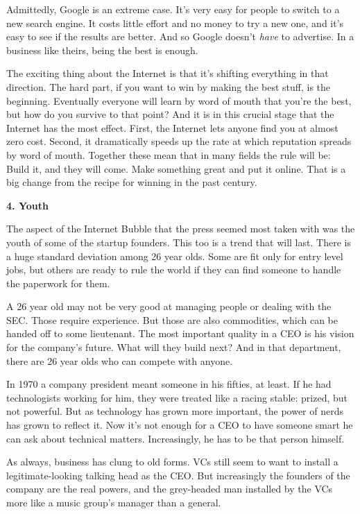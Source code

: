Admittedly, Google is an extreme case. It's very easy for people to
switch to a new search engine. It costs little effort and no money to
try a new one, and it's easy to see if the results are better. And so
Google doesn't \emph{have} to advertise. In a business like theirs,
being the best is enough.

The exciting thing about the Internet is that it's shifting everything
in that direction. The hard part, if you want to win by making the best
stuff, is the beginning. Eventually everyone will learn by word of mouth
that you're the best, but how do you survive to that point? And it is in
this crucial stage that the Internet has the most effect. First, the
Internet lets anyone find you at almost zero cost. Second, it
dramatically speeds up the rate at which reputation spreads by word of
mouth. Together these mean that in many fields the rule will be: Build
it, and they will come. Make something great and put it online. That is
a big change from the recipe for winning in the past century.

\textbf{4. Youth}

The aspect of the Internet Bubble that the press seemed most taken with
was the youth of some of the startup founders. This too is a trend that
will last. There is a huge standard deviation among 26 year olds. Some
are fit only for entry level jobs, but others are ready to rule the
world if they can find someone to handle the paperwork for them.

A 26 year old may not be very good at managing people or dealing with
the SEC. Those require experience. But those are also commodities, which
can be handed off to some lieutenant. The most important quality in a
CEO is his vision for the company's future. What will they build next?
And in that department, there are 26 year olds who can compete with
anyone.

In 1970 a company president meant someone in his fifties, at least. If
he had technologists working for him, they were treated like a racing
stable: prized, but not powerful. But as technology has grown more
important, the power of nerds has grown to reflect it. Now it's not
enough for a CEO to have someone smart he can ask about technical
matters. Increasingly, he has to be that person himself.

As always, business has clung to old forms. VCs still seem to want to
install a legitimate-looking talking head as the CEO. But increasingly
the founders of the company are the real powers, and the grey-headed man
installed by the VCs more like a music group's manager than a general.

